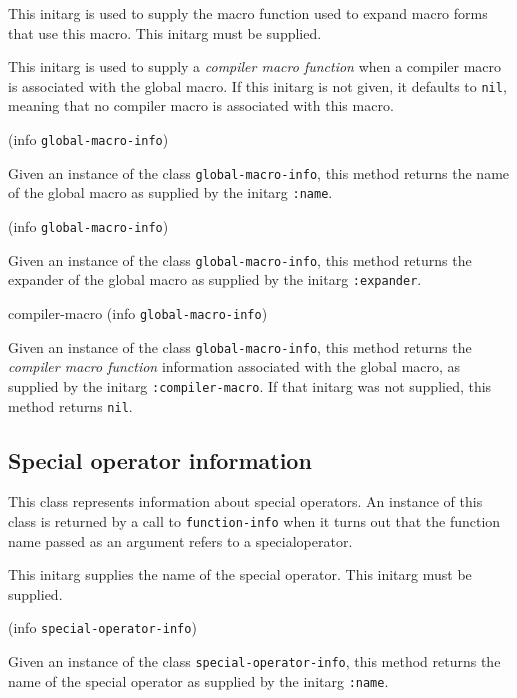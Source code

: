 
This initarg is used to supply the macro function used to expand macro
forms that use this macro.  This initarg must be supplied. 


This initarg is used to supply a \emph{compiler macro function} when
a compiler macro is associated with the global macro.  If this
initarg is not given, it defaults to \texttt{nil}, meaning that no
compiler macro is associated with this macro. 

 {(info {\tt global-macro-info})}

Given an instance of the class \texttt{global-macro-info}, this
method returns the name of the global macro as supplied by the
initarg \texttt{:name}.

 {(info {\tt global-macro-info})}

Given an instance of the class \texttt{global-macro-info}, this
method returns the expander of the global macro as supplied by the
initarg \texttt{:expander}.

\Defmethod compiler-macro {(info {\tt global-macro-info})}

Given an instance of the class \texttt{global-macro-info}, this
method returns the \emph{compiler macro function} information
associated with the global macro, as supplied by the initarg
\texttt{:compiler-macro}.  If that initarg was not supplied, this
method returns \texttt{nil}.

\subsection{Special operator information}


This class represents information about special operators.  An
instance of this class is returned by a call to \texttt{function-info}
when it turns out that the function name passed as an argument refers
to a specialoperator.


This initarg supplies the name of the special operator.  This initarg
must be supplied.

 {(info {\tt special-operator-info})}

Given an instance of the class \texttt{special-operator-info}, this
method returns the name of the special operator as supplied by the
initarg \texttt{:name}.

